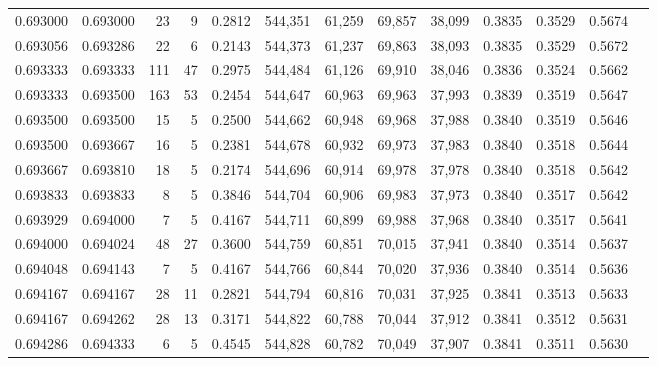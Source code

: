 \begin{tabular}{rrrrrrrrrrrrr}
0.693000 & 0.693000 &    23 &   9 &                                     0.2812 & 544,351 &  61,259 &  69,857 &  38,099 & 0.3835 & 0.3529 & 0.5674 \\
0.693056 & 0.693286 &    22 &   6 &                                     0.2143 & 544,373 &  61,237 &  69,863 &  38,093 & 0.3835 & 0.3529 & 0.5672 \\
0.693333 & 0.693333 &   111 &  47 &                                     0.2975 & 544,484 &  61,126 &  69,910 &  38,046 & 0.3836 & 0.3524 & 0.5662 \\
0.693333 & 0.693500 &   163 &  53 &                                     0.2454 & 544,647 &  60,963 &  69,963 &  37,993 & 0.3839 & 0.3519 & 0.5647 \\
0.693500 & 0.693500 &    15 &   5 &                                     0.2500 & 544,662 &  60,948 &  69,968 &  37,988 & 0.3840 & 0.3519 & 0.5646 \\
0.693500 & 0.693667 &    16 &   5 &                                     0.2381 & 544,678 &  60,932 &  69,973 &  37,983 & 0.3840 & 0.3518 & 0.5644 \\
0.693667 & 0.693810 &    18 &   5 &                                     0.2174 & 544,696 &  60,914 &  69,978 &  37,978 & 0.3840 & 0.3518 & 0.5642 \\
0.693833 & 0.693833 &     8 &   5 &                                     0.3846 & 544,704 &  60,906 &  69,983 &  37,973 & 0.3840 & 0.3517 & 0.5642 \\
0.693929 & 0.694000 &     7 &   5 &                                     0.4167 & 544,711 &  60,899 &  69,988 &  37,968 & 0.3840 & 0.3517 & 0.5641 \\
0.694000 & 0.694024 &    48 &  27 &                                     0.3600 & 544,759 &  60,851 &  70,015 &  37,941 & 0.3840 & 0.3514 & 0.5637 \\
0.694048 & 0.694143 &     7 &   5 &                                     0.4167 & 544,766 &  60,844 &  70,020 &  37,936 & 0.3840 & 0.3514 & 0.5636 \\
0.694167 & 0.694167 &    28 &  11 &                                     0.2821 & 544,794 &  60,816 &  70,031 &  37,925 & 0.3841 & 0.3513 & 0.5633 \\
0.694167 & 0.694262 &    28 &  13 &                                     0.3171 & 544,822 &  60,788 &  70,044 &  37,912 & 0.3841 & 0.3512 & 0.5631 \\
0.694286 & 0.694333 &     6 &   5 &                                     0.4545 & 544,828 &  60,782 &  70,049 &  37,907 & 0.3841 & 0.3511 & 0.5630 \\

\end{tabular}
